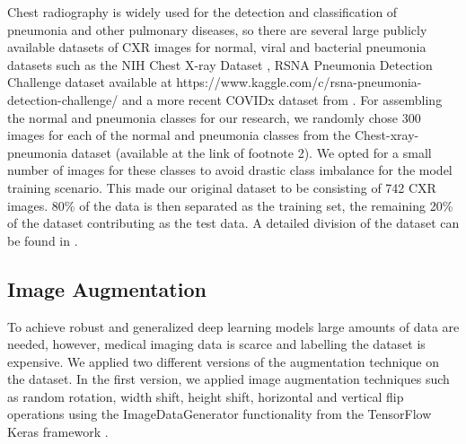 Chest radiography is widely used for the detection and classification of pneumonia and other pulmonary diseases, so there are several large publicly available datasets of CXR images for normal, viral and bacterial pneumonia datasets such as the NIH Chest X-ray Dataset \cite{jaeger2014two}, RSNA Pneumonia Detection Challenge dataset available at {https://www.kaggle.com/c/rsna-pneumonia-detection-challenge/}  and a more recent COVIDx dataset from \cite{wang2020covid}. For assembling the normal and pneumonia classes for our research, we randomly chose 300 images for each of the normal and pneumonia classes from the Chest-xray-pneumonia dataset (available at the link of footnote 2). We opted for a small number of images for these classes to avoid drastic class imbalance for the model training scenario. This made our original dataset to be consisting of 742 CXR images. 80\% of the data is then separated as the training set, the remaining 20\% of the dataset contributing as the test data. A detailed division of the dataset can be found in .

\subsection{Image Augmentation}
To achieve robust and generalized deep learning models large amounts of data are needed, however, medical imaging data is scarce and labelling the dataset is expensive. We applied two different versions of the augmentation technique on the dataset. In the first version, we applied image augmentation techniques \cite{shorten2019survey} such as random rotation, width shift, height shift, horizontal and vertical flip operations using the ImageDataGenerator functionality from the TensorFlow Keras framework \cite{chollet2018introduction, gulli2017deep}. 

